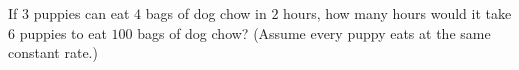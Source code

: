 If $3$ puppies can eat $4$ bags of dog chow in $2$ hours, how many hours would it take $6$ puppies to eat $100$ bags of dog chow? (Assume every puppy eats at the same constant rate.)
